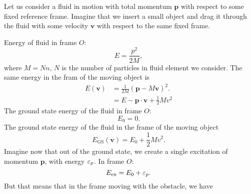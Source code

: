 Let us consider a fluid in motion with total momentum $\bm{p}$ with respect to some fixed reference frame. 
Imagine that we insert a small object and drag it through the fluid with some velocity $\bm{v}$ with respect to the same fixed frame. 
\begin{center}
\end{center}	
Energy of fluid in frame $O$:
\begin{equation}
	E = \frac{p^2}{2M},
\end{equation}
where $M = Nn$, $N$ is the number of particles in fluid element we consider. 
The same energy in the fram of the moving object is 
\begin{equation}
	\begin{aligned}
	E(\bm{v}) &= \frac{1}{2M}\left (\bm{p}-M\bm{v}\right )^2. \\
	&= E - \bm{p}\cdot\bm{v} + \frac{1}{2}Mv^2
	\end{aligned}
\end{equation}
The ground state energy of the fluid in frame $O$:
\begin{equation}
	E_0 = 0.
\end{equation}
The ground state energy of the fluid in the frame of the moving object
\begin{equation}
	E_{\text{GS}}(\bm{v}) = E_0 + \frac{1}{2}Mv^2.
\end{equation}
Imagine now that out of the ground state, we create a single excitation of momentum $\bm{p}$, with energy \emph{$\varepsilon_p$}.
In frame $O$:
\begin{equation}
	E_{\text{ex}} = E_0 + \varepsilon_p.
\end{equation}
But that means that in the frame moving with the obstacle, we have

